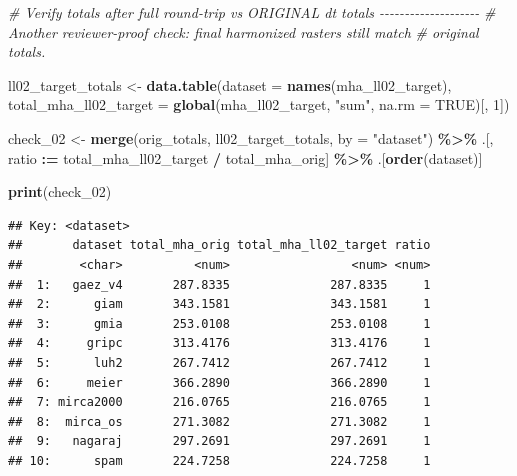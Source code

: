 \documentclass[
  11pt,
]{article}
\newenvironment{Shaded}{\begin{snugshade}}{\end{snugshade}}
\newcommand{\AttributeTok}[1]{\textcolor[rgb]{0.13,0.29,0.53}{#1}}
\newcommand{\CommentTok}[1]{\textcolor[rgb]{0.56,0.35,0.01}{\textit{#1}}}
\newcommand{\ConstantTok}[1]{\textcolor[rgb]{0.56,0.35,0.01}{#1}}
\newcommand{\DecValTok}[1]{\textcolor[rgb]{0.00,0.00,0.81}{#1}}
\newcommand{\FunctionTok}[1]{\textcolor[rgb]{0.13,0.29,0.53}{\textbf{#1}}}
\newcommand{\NormalTok}[1]{#1}
\newcommand{\OtherTok}[1]{\textcolor[rgb]{0.56,0.35,0.01}{#1}}
\newcommand{\SpecialCharTok}[1]{\textcolor[rgb]{0.81,0.36,0.00}{\textbf{#1}}}
\newcommand{\StringTok}[1]{\textcolor[rgb]{0.31,0.60,0.02}{#1}}
\begin{document}
\begin{Shaded}
\begin{Highlighting}[]
\CommentTok{\# Verify totals after full round{-}trip vs ORIGINAL dt totals {-}{-}{-}{-}{-}{-}{-}{-}{-}{-}{-}{-}{-}{-}{-}{-}{-}{-}{-}{-}}
\CommentTok{\# Another reviewer{-}proof check: final harmonized rasters still match }
\CommentTok{\# original totals.}

\NormalTok{ll02\_target\_totals }\OtherTok{\textless{}{-}} \FunctionTok{data.table}\NormalTok{(}\AttributeTok{dataset =} \FunctionTok{names}\NormalTok{(mha\_ll02\_target),}
                                 \AttributeTok{total\_mha\_ll02\_target =} \FunctionTok{global}\NormalTok{(mha\_ll02\_target, }
                                                                \StringTok{"sum"}\NormalTok{, }\AttributeTok{na.rm =} \ConstantTok{TRUE}\NormalTok{)[, }\DecValTok{1}\NormalTok{])}

\NormalTok{check\_02 }\OtherTok{\textless{}{-}} \FunctionTok{merge}\NormalTok{(orig\_totals, ll02\_target\_totals, }\AttributeTok{by =} \StringTok{"dataset"}\NormalTok{) }\SpecialCharTok{\%\textgreater{}\%}
\NormalTok{  .[, ratio }\SpecialCharTok{:=}\NormalTok{ total\_mha\_ll02\_target }\SpecialCharTok{/}\NormalTok{ total\_mha\_orig] }\SpecialCharTok{\%\textgreater{}\%}
\NormalTok{  .[}\FunctionTok{order}\NormalTok{(dataset)]}

\FunctionTok{print}\NormalTok{(check\_02)}
\end{Highlighting}
\end{Shaded}

\begin{verbatim}
## Key: <dataset>
##       dataset total_mha_orig total_mha_ll02_target ratio
##        <char>          <num>                 <num> <num>
##  1:   gaez_v4       287.8335              287.8335     1
##  2:      giam       343.1581              343.1581     1
##  3:      gmia       253.0108              253.0108     1
##  4:     gripc       313.4176              313.4176     1
##  5:      luh2       267.7412              267.7412     1
##  6:     meier       366.2890              366.2890     1
##  7: mirca2000       216.0765              216.0765     1
##  8:  mirca_os       271.3082              271.3082     1
##  9:   nagaraj       297.2691              297.2691     1
## 10:      spam       224.7258              224.7258     1
\end{verbatim}
\end{document}
